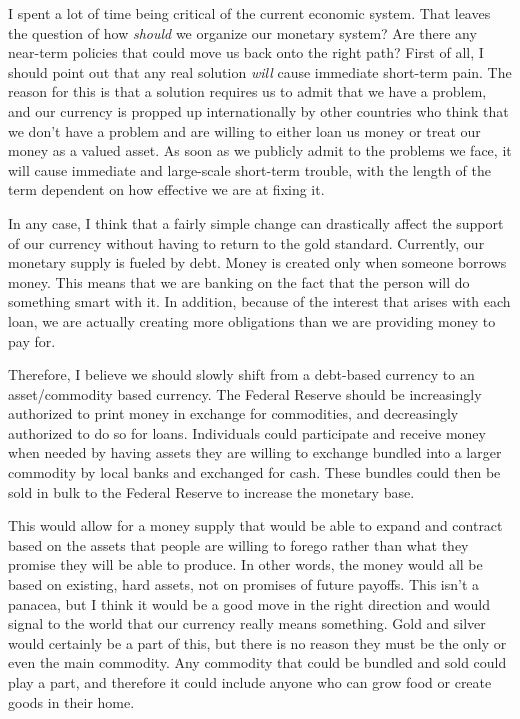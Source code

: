 \begin{policynote}
I spent a lot of time being critical of the current economic system.
That leaves the question of how \textit{should} we organize our monetary system?
Are there any near-term policies that could move us back onto the right path?
First of all, I should point out that any real solution \textit{will} cause immediate 
short-term pain.  The reason for this is that a solution requires us to
admit that we have a problem, and our currency is propped up internationally
by other countries who think that we don't have a problem and are willing to either
loan us money or treat our money as a valued asset.  As soon as we
publicly admit to the problems we face, it will cause immediate and large-scale
short-term trouble, with the length of the term dependent on how effective 
we are at fixing it.  

In any case, I think that a fairly simple change
can drastically affect the support of our currency without having to return
to the gold standard.  Currently, our monetary supply is fueled by debt.
Money is created only when someone borrows money.  This means that we
are banking on the fact that the person will do something smart with it.
In addition, because of the interest that arises with each loan, we are 
actually creating more obligations than we are providing money to pay for.

Therefore, I believe we
should slowly shift from a debt-based currency to an asset/commodity based currency.
The Federal Reserve should be increasingly authorized to print money in exchange for 
commodities, and decreasingly authorized to do so for loans.  
Individuals could participate and receive money when needed by 
having assets they are willing to exchange bundled into a larger commodity by local
banks and exchanged for cash.  These bundles could then be sold in bulk to the Federal 
Reserve to increase the monetary base.

This would allow
for a money supply that would be able to expand and contract based on 
the assets that people are willing to forego rather than what they 
promise they will be able to produce.  In other words, the money
would all be based on existing, hard assets, not on promises of future
payoffs.  This isn't a panacea, but I think it would be a good move
in the right direction and would signal to the world that our currency
really means something.  Gold and silver would certainly be a part of this,
but there is no reason they must be the only or even the main commodity.
Any commodity that could be bundled and sold could play a part, and therefore
it could include anyone who can grow food or create goods in their home.
\end{policynote}

